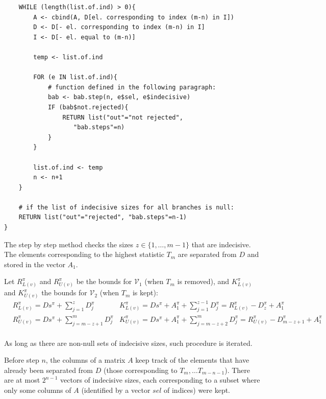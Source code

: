 \documentclass[11pt,a4paper,openright,twoside]{article}
\begin{document}
\begin{lstlisting}
	WHILE (length(list.of.ind) > 0){
		A <- cbind(A, D[el. corresponding to index (m-n) in I])
		D <- D[- el. corresponding to index (m-n) in I]
		I <- D[- el. equal to (m-n)]
		
		temp <- list.of.ind
		
		FOR (e IN list.of.ind){
			# function defined in the following paragraph:
			bab <- bab.step(n, e$sel, e$indecisive)
			IF (bab$not.rejected){
				RETURN list("out"="not rejected",
				   "bab.steps"=n)
			}
		}

		list.of.ind <- temp
		n <- n+1
	}

	# if the list of indecisive sizes for all branches is null:
	RETURN list("out"="rejected", "bab.steps"=n-1)
}
\end{lstlisting}

\vspace{3mm}
\noindent
The step by step method checks the sizes $z\in\{1,\ldots,m-1\}$ that are indecisive. The elements corresponding to the highest statistic $T_{m}$ are separated from $D$ and stored in the vector $A_1$.

Let $R_{L(v)}^{\pi}$ and $R_{U(v)}^{\pi}$ be the bounds for $\mathcal{V}_1$ (when $T_{m}$ is removed), and $K_{L(v)}^{\pi}$ and $K_{U(v)}^{\pi}$ the bounds for $\mathcal{V}_2$ (when $T_{m}$ is kept):
\begin{align*}
& R_{L(v)}^{\pi}=Ds^{\pi}+\sum_{j=1}^{z} D_j^{\pi} & K_{L(v)}^{\pi}=Ds^{\pi}+A_1^{\pi}+\sum_{j=1}^{z-1} D_j^{\pi}=R_{L(v)}^{\pi} - D_z^{\pi} + A_1^{\pi}\\
& R_{U(v)}^{\pi}=Ds^{\pi}+\sum_{j=m-z+1}^{m} D_j^{\pi} & K_{U(v)}^{\pi}=Ds^{\pi}+A_1^{\pi}+\sum_{j=m-z+2}^{m} D_j^{\pi}=R_{U(v)}^{\pi} - D_{m-z+1}^{\pi} + A_1^{\pi}\\
\end{align*}

As long as there are non-null sets of indecisive sizes, such procedure is iterated.

Before step $n$, the columns of a matrix $A$ keep track of the elements that have already been separated from $D$ (those corresponding to $T_{m},\ldots T_{m-n-1}$). There are at most $2^{n-1}$ vectors of indecisive sizes, each corresponding to a subset where only some columns of $A$ (identified by a vector $sel$ of indices) were kept.
\end{document}
